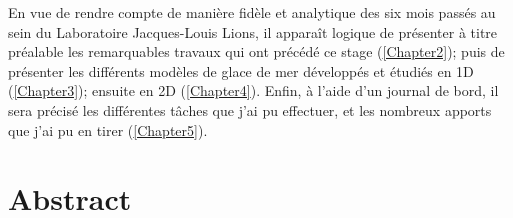 En vue de rendre compte de manière fidèle et analytique des six mois passés au sein du Laboratoire Jacques-Louis Lions, il apparaît logique de présenter à titre préalable les remarquables travaux qui ont précédé ce stage (\cref{Chapter2}); puis de présenter les différents modèles de glace de mer développés et étudiés en 1D (\cref{Chapter3}); ensuite en 2D (\cref{Chapter4}). Enfin, à l'aide d'un journal de bord, il sera précisé les différentes tâches que j’ai pu effectuer, et les nombreux apports que j’ai pu en tirer (\cref{Chapter5}). 









\section{Abstract}